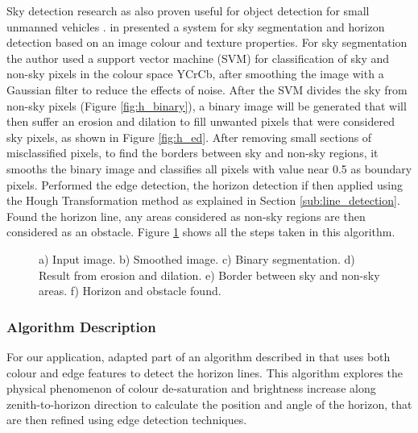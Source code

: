Sky detection research as also proven useful for object detection for small unmanned vehicles \cite{mcgee2005obstacle}. \citeauthor{mcgee2005obstacle} in \cite{mcgee2005obstacle} presented a system for sky segmentation and horizon detection based on an image colour and texture properties.
For sky segmentation the author used a support vector machine (SVM) for classification of sky and non-sky pixels in the colour space YCrCb, after smoothing the image with a Gaussian filter to reduce the effects of noise. After the SVM divides the sky from non-sky pixels (Figure \ref{fig:h_binary}), a binary image will be generated that will then suffer an erosion and dilation to fill unwanted pixels that were considered sky pixels, as shown in Figure \ref{fig:h_ed}. After removing small sections of misclassified pixels, to find the borders between sky and non-sky regions, it smooths the binary image and classifies all pixels with value near 0.5 as boundary pixels. Performed the edge detection, the horizon detection if then applied using the Hough Transformation method as explained in Section \ref{sub:line_detection}. Found the horizon line, any areas considered as non-sky regions are then considered as an obstacle. Figure \ref{fig:horizon} shows all the steps taken in this algorithm.
\begin{figure}[htbp]
	\centering
    \caption{a) Input image. b) Smoothed image. c) Binary segmentation. d) Result from erosion and dilation. e) Border between sky and non-sky areas. f) Horizon and obstacle found.}
    \label{fig:horizon}
\end{figure}

\subsubsection{Algorithm Description}
For our application, adapted part of an algorithm described in \cite{zafarifar2008horizon} that uses both colour and edge features to detect the horizon lines. This algorithm explores the physical phenomenon of colour de-saturation and brightness increase along zenith-to-horizon direction to calculate the position and angle of the horizon, that are then refined using edge detection techniques.

